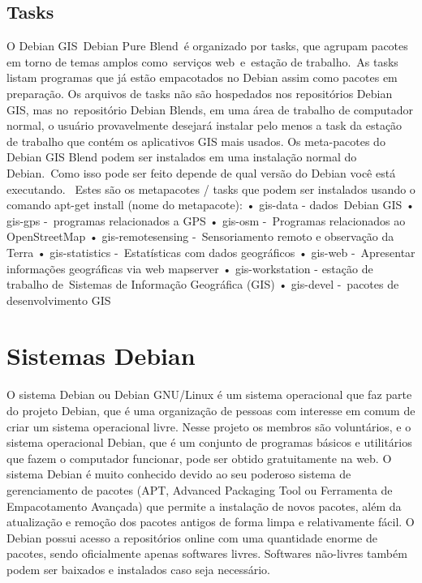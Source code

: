 \subsection{Tasks}

O Debian GIS Debian Pure Blend é organizado por tasks, que agrupam pacotes em torno de temas amplos como serviços web e estação de trabalho. As tasks listam programas que já estão empacotados no Debian assim como pacotes em preparação. Os arquivos de tasks não são hospedados nos repositórios Debian GIS, mas no repositório Debian Blends, em uma área de trabalho de computador normal, o usuário provavelmente desejará instalar pelo menos a task da estação de trabalho que contém os aplicativos GIS mais usados. 
Os meta-pacotes do Debian GIS Blend podem ser instalados em uma instalação normal do Debian. Como isso pode ser feito depende de qual versão do Debian você está executando.  
Estes são os metapacotes / tasks que podem ser instalados usando o comando apt-get install (nome do metapacote):
• gis-data - dados Debian GIS
• gis-gps - programas relacionados a GPS
• gis-osm - Programas relacionados ao OpenStreetMap
• gis-remotesensing - Sensoriamento remoto e observação da Terra
• gis-statistics - Estatísticas com dados geográficos
• gis-web - Apresentar informações geográficas via web mapserver
• gis-workstation - estação de trabalho de Sistemas de Informação Geográfica (GIS)
• gis-devel - pacotes de desenvolvimento GIS

\section{Sistemas Debian}

O sistema Debian ou Debian GNU/Linux é um sistema operacional que faz parte do projeto Debian, que é uma organização de pessoas com interesse em comum de criar um sistema operacional livre. Nesse projeto os membros são voluntários, e o sistema operacional Debian, que é um conjunto de programas básicos e utilitários que fazem o computador funcionar, pode ser obtido gratuitamente na web. O sistema Debian é muito conhecido devido ao seu poderoso sistema de gerenciamento de pacotes (APT, Advanced Packaging Tool ou Ferramenta de Empacotamento Avançada) que permite a instalação de novos pacotes, além da atualização e remoção dos pacotes antigos de forma limpa e relativamente fácil. O Debian possui acesso a repositórios online com uma quantidade enorme de pacotes, sendo oficialmente apenas softwares livres. Softwares não-livres também podem ser baixados e instalados caso seja necessário.

